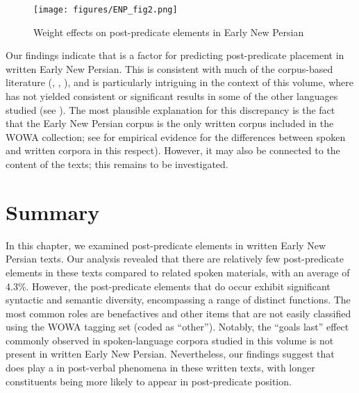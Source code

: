 \documentclass[output=paper,colorlinks,citecolor=brown,draftmode]{langscibook}
\begin{document}
\begin{figure}
 \texttt{[image: figures/ENP\_fig2.png]}
 \caption{Weight effects on post-predicate elements in Early New Persian}
 \label{ENP:fig:2}
\end{figure}
 
Our findings indicate that  is a factor for predicting post-predicate placement in written Early New Persian. This is consistent with much of the corpus-based literature (\citealt{Hawkins1994performance}, \citealt{Stallingsetal1998Phrasal}, \citealt{ArnoldLosongco2000}), and is particularly intriguing in the context of this volume, where  has not yielded consistent or significant results in some of the other languages studied (see ). The most plausible explanation for this discrepancy is the fact that the Early New Persian corpus is the only written corpus included in the WOWA collection; see \citet{SchnellSchiborr2022Cross} for empirical evidence for the differences between spoken and written corpora in this respect). However, it may also be connected to the content of the texts; this remains to be investigated.

\section{Summary}\label{ENP:ss:5}

In this chapter, we examined post-predicate elements in written Early New Persian texts. Our analysis revealed that there are relatively few post-predicate elements in these texts compared to related spoken materials, with an average of 4.3\%. However, the post-predicate elements that do occur exhibit significant syntactic and semantic diversity, encompassing a range of distinct functions. The most common roles are benefactives and other items that are not easily classified using the WOWA tagging set (coded as ``other''). Notably, the ``goals last'' effect commonly observed in spoken-language corpora studied in this volume is not present in written Early New Persian. Nevertheless, our findings suggest that  does play a  in post-verbal phenomena in these written texts, with longer constituents being more likely to appear in post-predicate position.
\end{document}
